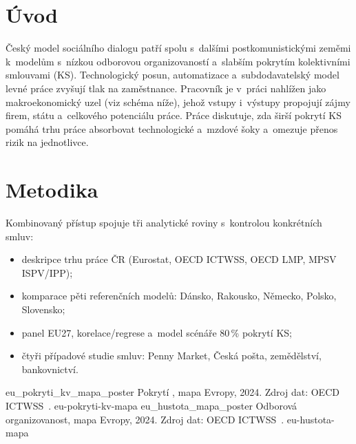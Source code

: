 \documentclass[czech]{CTUposter}
\begin{document}
\makepostertitle

\begin{posterbody}

\abstractCS{%
  
}

\abstractEN{%
  
}

\section{Úvod}
Český model sociálního dialogu patří spolu s~dalšími postkomunistickými zeměmi
k~modelům s~nízkou odborovou organizovaností a~slabším pokrytím kolektivními
smlouvami (KS). Technologický posun, automatizace a~subdodavatelský model levné práce
zvyšují tlak na zaměstnance. Pracovník je v~práci nahlížen jako makroekonomický uzel (viz schéma níže), jehož vstupy i~výstupy propojují zájmy firem, státu a~celkového potenciálu práce. Práce diskutuje, zda širší pokrytí KS pomáhá trhu práce absorbovat technologické a~mzdové šoky a~omezuje přenos rizik na jednotlivce.



\section{Metodika}
Kombinovaný přístup spojuje tři analytické roviny s~kontrolou konkrétních smluv:
\begin{itemize}
  \item deskripce trhu práce \acs{ČR} (Eurostat, \acs{OECD} \acs{ICTWSS},
    \acs{OECD} \acs{LMP}, \acs{MPSV} \acs{ISPV}/\acs{IPP});
  \item komparace pěti referenčních modelů: Dánsko, Rakousko, Německo, Polsko, Slovensko;
  \item panel EU27, korelace/regrese a~model scénáře 80\,\% pokrytí \acs{KS};
  \item čtyři případové studie smluv: Penny Market, Česká pošta, zemědělství, bankovnictví.
\end{itemize}

\postertwofigures
      {eu_pokryti_kv_mapa_poster}
  {Pokrytí , mapa Evropy, 2024. Zdroj dat: \acs{OECD} \acs{ICTWSS}~\cite{oecd_aias_ictwss_CBC_ERB_pct}.}
      {eu-pokryti-kv-mapa}
      {eu_hustota_mapa_poster}
  {Odborová organizovanost, mapa Evropy, 2024. Zdroj dat: \acs{OECD} \acs{ICTWSS}~\cite{oecd_aias_ictwss_TUD_pct}.}
      {eu-hustota-mapa}


\end{posterbody}
\end{document}
